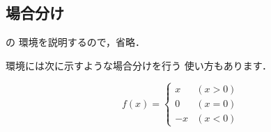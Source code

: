 {{%
%
%




\subsection{場合分け}
%

\AmSLaTeX の 環境を説明するので，省略．

環境には次に示すような場合分けを行う
使い方もあります．
\begin{inout}
\[ f(x)= \left\{
  \begin{array}{cl}
    x & (x > 0)\\
    0 & (x = 0)\\
   -x & (x < 0) 
  \end{array} 
\right. \] 
\end{inout}



}}
